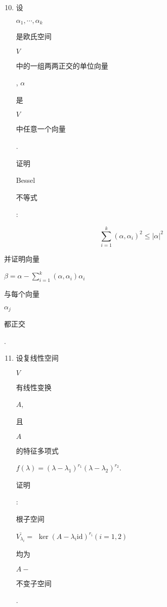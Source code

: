 \documentclass[10pt]{article}
\begin{document}
\begin{enumerate}
  \setcounter{enumi}{9}
  \item \begin{CJK}{UTF8}{mj}设\end{CJK} $\alpha_{1}, \cdots, \alpha_{k}$ \begin{CJK}{UTF8}{mj}是欧氏空间\end{CJK} $V$ \begin{CJK}{UTF8}{mj}中的一组两两正交的单位向量\end{CJK}, $\alpha$ \begin{CJK}{UTF8}{mj}是\end{CJK} $V$ \begin{CJK}{UTF8}{mj}中任意一个向量\end{CJK}. \begin{CJK}{UTF8}{mj}证明\end{CJK} Bessel \begin{CJK}{UTF8}{mj}不等式\end{CJK}:
\end{enumerate}
$$
\sum_{i=1}^{k}\left(\alpha, \alpha_{i}\right)^{2} \leqslant|\alpha|^{2}
$$
\begin{CJK}{UTF8}{mj}并证明向量\end{CJK} $\beta=\alpha-\sum_{i=1}^{k}\left(\alpha, \alpha_{i}\right) \alpha_{i}$ \begin{CJK}{UTF8}{mj}与每个向量\end{CJK} $\alpha_{j}$ \begin{CJK}{UTF8}{mj}都正交\end{CJK}.

\begin{enumerate}
  \setcounter{enumi}{10}
  \item \begin{CJK}{UTF8}{mj}设复线性空间\end{CJK} $V$ \begin{CJK}{UTF8}{mj}有线性变换\end{CJK} $A$, \begin{CJK}{UTF8}{mj}且\end{CJK} $A$ \begin{CJK}{UTF8}{mj}的特征多项式\end{CJK} $f(\lambda)=\left(\lambda-\lambda_{1}\right)^{r_{1}}\left(\lambda-\lambda_{2}\right)^{r_{2}}$. \begin{CJK}{UTF8}{mj}证明\end{CJK}: \begin{CJK}{UTF8}{mj}根子空间\end{CJK} $\overline{V_{\lambda_{i}}}=$ $\operatorname{ker}\left(A-\lambda_{i} \mathrm{id}\right)^{r_{i}}(i=1,2)$ \begin{CJK}{UTF8}{mj}均为\end{CJK} $A-$ \begin{CJK}{UTF8}{mj}不变子空间\end{CJK}.
\end{enumerate}
\end{document}
